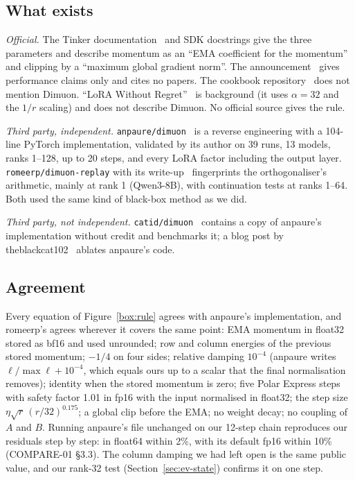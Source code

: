 \documentclass[11pt]{article}
\begin{document}
\subsection{What exists}
\emph{Official.} The Tinker documentation~\cite{tinkerdocs} and SDK docstrings give the three
parameters and describe momentum as an ``EMA coefficient for the momentum'' and clipping by a
``maximum global gradient norm''. The announcement~\cite{announce} gives performance claims only and
cites no papers. The cookbook repository~\cite{cookbook} does not mention Dimuon. ``LoRA Without
Regret''~\cite{lorawithoutregret} is background (it uses $\alpha=32$ and the $1/r$ scaling) and does not
describe Dimuon. No official source gives the rule.

\emph{Third party, independent.} \texttt{anpaure/dimuon}~\cite{anpaure} is a reverse engineering with
a 104-line PyTorch implementation, validated by its author on 39 runs, 13 models, ranks 1--128, up to
20 steps, and every LoRA factor including the output layer. \texttt{romeerp/dimuon-replay} with its
write-up~\cite{romeerp,romeerpblog} fingerprints the orthogonaliser's arithmetic, mainly at rank 1
(Qwen3-8B), with continuation tests at ranks 1--64. Both used the same kind of black-box method as
we did.

\emph{Third party, not independent.} \texttt{catid/dimuon}~\cite{catid} contains a copy of anpaure's
implementation without credit and benchmarks it; a blog post by theblackcat102~\cite{zrt} ablates
anpaure's code.

\subsection{Agreement}
Every equation of Figure~\ref{box:rule} agrees with anpaure's implementation, and romeerp's agrees
wherever it covers the same point: EMA momentum in float32 stored as bf16 and used unrounded; row and
column energies of the previous stored momentum; $-1/4$ on four sides; relative damping $10^{-4}$
(anpaure writes $\ell/\max\ell+10^{-4}$, which equals ours up to a scalar that the final normalisation
removes); identity when the stored momentum is zero; five Polar Express steps with safety factor 1.01
in fp16 with the input normalised in float32; the step size $\eta\sqrt r\,(r/32)^{0.175}$; a global
clip before the EMA; no weight decay; no coupling of $A$ and $B$. Running anpaure's file unchanged on
our 12-step chain reproduces our residuals step by step: in float64 within 2\%, with its default fp16
within 10\% (COMPARE-01 \S3.3). The column damping we had left open is the same public value, and our
rank-32 test (Section~\ref{sec:ev-state}) confirms it on one step.
\end{document}
